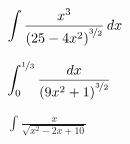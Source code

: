 \documentclass[../mathNotesPreamble]{subfiles}
\begin{document}
  \begin{ex*}
    $\displaystyle \int \frac{x^3}{{\left(25-4x^2\right)}^{\nicefrac{3}{2}}}\,dx$
  \end{ex*}
  \pagebreak

  \begin{ex*}
    $\displaystyle \int_{0}^{\nicefrac{1}{3}} \frac{dx}{{\left(9x^2+1\right)}^{\nicefrac{3}{2}}}$
  \end{ex*}
  \pagebreak

  \begin{ex*}
    $\displaystyle \int \frac{x}{\sqrt{x^2-2x+10}}$
  \end{ex*}
  \pagebreak

  \pagebreak
\end{document}
